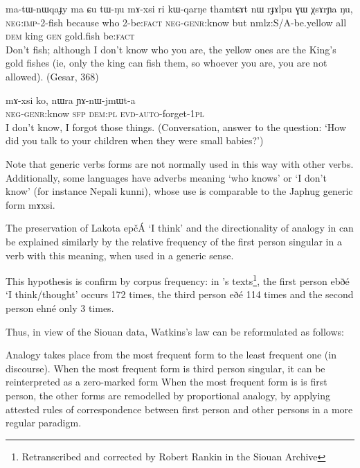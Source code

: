 \documentclass[oldfontcommands,oneside,a4paper,11pt]{article}
\newcommand{\ipa}[1]{{\phon#1}} %
\begin{document}
\begin{exe}
 \ex \label{ex:mAxsi}
 \gll
\ipa{ma-tɯ-nɯqaɟy}  	\ipa{ma}  	\ipa{ɕu}  	\ipa{tɯ-ŋu}  	\ipa{mɤ-xsi}  	\ipa{ri} \ipa{kɯ-qarŋe}  	\ipa{thamtɕɤt}  	\ipa{nɯ}  	\ipa{rɟɤlpu}  	\ipa{ɣɯ}  	\ipa{χsɤrɲa}  	\ipa{ŋu,}  	
 \\
\textsc{neg:imp}-2-fish because who 2-be:\textsc{fact} \textsc{neg-genr}:know but nmlz:S/A-be.yellow all \textsc{dem} king \textsc{gen} gold.fish be:\textsc{fact}\\
\glt Don't fish; although I don't know who you are, the yellow ones are the King's gold fishes (ie, only the king can fish them, so whoever you are, you are not allowed). (Gesar, 368)
\end{exe}
\begin{exe}
 \ex \label{ex:mAxsi2}
 \gll
\ipa{mɤ-xsi}  	\ipa{ko,}  	\ipa{nɯra}  	\ipa{ɲɤ-nɯ-jmɯt-a}  \\
\textsc{neg-genr}:know \textsc{sfp} \textsc{dem:pl} \textsc{evd-auto}-forget-\textsc{1pl} \\
\glt I don't know, I forgot those things. (Conversation, answer to the question: `How did you talk to your children when they were small babies?')
\end{exe}

Note that generic verbs forms are not normally used in this way with other verbs. Additionally, some languages have adverbs meaning `who knows' or `I don't know' (for instance Nepali \ipa{kunni}),  whose use is comparable to the Japhug generic form \ipa{mɤxsi}.

The preservation of Lakota \ipa{epčÁ} `I think' and the directionality of analogy in can be explained similarly by the relative frequency of the first person singular in a verb with this meaning, when used in a generic sense.


This hypothesis is confirm by corpus frequency: in \citet{dorsey1890cegiha}'s texts\footnote{Retranscribed and corrected by Robert Rankin in the Siouan Archive}, the first person \ipa{ebðé} `I think/thought' occurs 172 times, the third person  \ipa{eðé} 114 times and the second person  \ipa{ehné} only 3 times.  

Thus, in view of the Siouan data, Watkins's law can be reformulated as follows:

\begin{exe}
\ex 
\glt Analogy takes place from the most frequent form to the least frequent one (in discourse). 
\glt When the most frequent form is third person singular, it can be reinterpreted as a zero-marked form
\glt  When the most frequent form is  is first person, the other forms are remodelled by proportional analogy, by applying attested rules of correspondence between first person and other persons in a more regular paradigm.
\end{exe}
 



\end{document}
